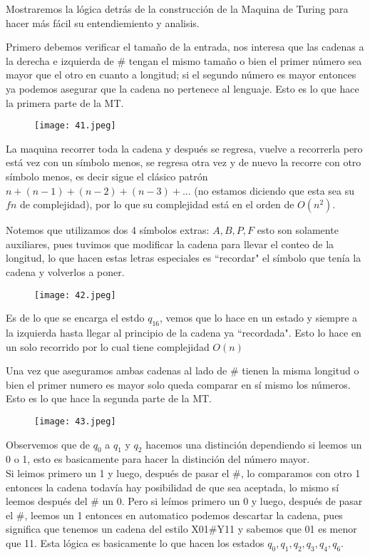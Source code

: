 \documentclass[12pt,letterpaper]{article}
\begin{document}
Mostraremos la lógica detrás de la construcción de la Maquina de Turing para hacer más fácil su entendiemiento y analisis.

Primero debemos verificar el tamaño de la entrada, nos interesa que las cadenas a la derecha e izquierda de \# tengan el mismo tamaño o bien el primer número sea mayor que el otro en cuanto a longitud; si el segundo número es mayor entonces ya podemos asegurar que la cadena no pertenece al lenguaje. Esto es lo que hace la primera parte de la MT.

\begin{figure}[htb]
    \centering
    \texttt{[image: 41.jpeg]}
\end{figure}

La maquina recorrer toda la cadena y después se regresa, vuelve a recorrerla pero está vez con un símbolo menos, se regresa otra vez y de nuevo la recorre con otro símbolo menos, es decir sigue el clásico patrón $n+(n-1)+(n-2)+(n-3)+...$ (no estamos diciendo que esta sea su $fn$ de complejidad), por lo que su complejidad está en el orden de $O(n^2)$.

Notemos que utilizamos dos 4 símbolos extras: $A,B,P,F$ esto son solamente auxiliares, pues tuvimos que modificar la cadena para llevar el conteo de la longitud, lo que hacen estas letras especiales es ``recordar" el símbolo que tenía la cadena y volverlos a poner.

\begin{figure}[htb]
    \centering
    \texttt{[image: 42.jpeg]}
\end{figure}

Es de lo que se encarga el estdo $q_{16}$, vemos que lo hace en un estado y siempre a la izquierda hasta llegar al principio de la cadena ya ``recordada". Esto lo hace en un solo recorrido por lo cual tiene complejidad $O(n)$

Una vez que aseguramos ambas cadenas al lado de \# tienen la misma longitud o bien el primer numero es mayor solo queda comparar en sí mismo los números. Esto es lo que hace la segunda parte de la MT.
\newpage

\begin{figure}[htb]
    \centering
    \texttt{[image: 43.jpeg]}
\end{figure}

Observemos que de $q_0$ a $q_1$ y $q_2$ hacemos una distinción dependiendo si leemos un 0 o 1, esto es basicamente para hacer la distinción del número mayor.\\
Si leimos primero un 1 y luego, después de pasar el \#, lo comparamos con otro 1 entonces la cadena todavía hay posibilidad de que sea aceptada, lo mismo sí leemos después del \# un 0. Pero si leímos primero un 0 y luego, después de pasar el \#, leemos un 1 entonces en automatico podemos descartar la cadena, pues significa que tenemos un cadena del estilo X01\#Y11 y sabemos que 01 es menor que 11. Esta lógica es basicamente lo que hacen los estados $q_0, q_1, q_2, q_3, q_4, q_6$.
\end{document}
